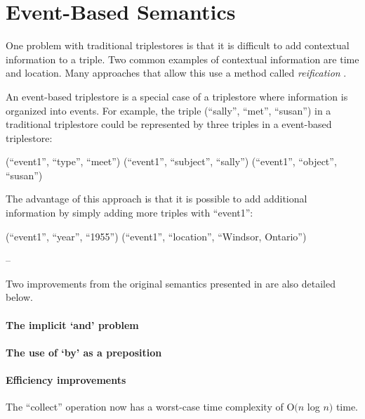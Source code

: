\documentclass[../main.tex]{subfiles}
\begin{document}
\chapter {Event-Based Semantics}

One problem with traditional triplestores is that it is difficult to add contextual information to a triple.  Two common examples of contextual information are time and location.  Many approaches that allow this use a method called {\em reification} \cite{?}.

An event-based triplestore is a special case of a triplestore where information is organized into events.  For example, the triple (``sally'', ``met'', ``susan'') in a traditional triplestore could be represented by three triples in a event-based triplestore:

\begin{code}
	(``event1'', ``type'', ``meet'')
	(``event1'', ``subject'', ``sally'')
	(``event1'', ``object'', ``susan'')
\end{code}

The advantage of this approach is that it is possible to add additional information by simply adding more triples with ``event1'':

\begin{code}
	(``event1'', ``year'', ``1955'')
	(``event1'', ``location'', ``Windsor, Ontario'')
\end{code}

--

Two improvements from the original semantics presented in \cite{frost2014demonstration} \cite{frostagbola2014} are also detailed below.

\subsubsection*{The implicit `and' problem}

\subsubsection*{The use of `by' as a preposition}

\subsubsection*{Efficiency improvements}

The ``collect'' operation now has a worst-case time complexity of O$(n$ log $n)$ time.
\end{document}
